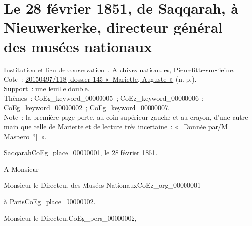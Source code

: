 \documentclass{book}
\begin{document}
\hypertarget{CoEg_Mariette_1851-02-28}{}
\section*{Le 28 février 1851, de Saqqarah, à Nieuwerkerke, directeur général des musées nationaux}
{\footnotesize
\noindent Institution et lieu de conservation~: Archives nationales, Pierrefitte-sur-Seine.\\
Cote~: \hyperlink{CoEg_Mariette_ms_001}{20150497/118, dossier 145 «~Mariette, Auguste~»} (n. p.).\\
Support~: une feuille double.\\
Thèmes~: \gls{CoEg_keyword_00000005}~;  \gls{CoEg_keyword_00000006}~;  \gls{CoEg_keyword_00000002}~;  \gls{CoEg_keyword_00000007}.\\
Note~: la première page porte, au coin supérieur gauche et au crayon, d’une autre main que celle de Mariette et de lecture très incertaine~: «~[Donnée par/M Maspero~?]~».}
\begin{flushright}
Saqqarah\gls{CoEg_place_00000001}, le 28 février 1851.
\end{flushright}
A Monsieur
\begin{center} Monsieur le Directeur des Musées Nationaux\gls{CoEg_org_00000001}\end{center}
\begin{flushright}à Paris\gls{CoEg_place_00000002}.\end{flushright}

\hspace{1cm} Monsieur le Directeur\gls{CoEg_pers_00000002},\\
\end{document}
